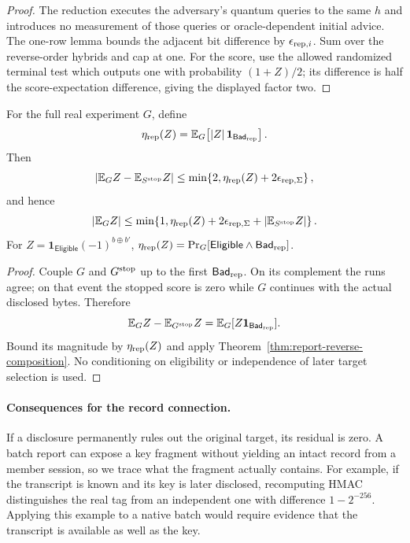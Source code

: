 \begin{proof}
The reduction executes the adversary's quantum queries to the same $h$ and
introduces no measurement of those queries or oracle-dependent initial advice.
The one-row lemma bounds the adjacent bit difference by
$\epsilon_{{\rm rep},i}$.  Sum over the reverse-order hybrids and cap at one.
For the score, use the allowed randomized terminal test which outputs one
with probability $(1+Z)/2$; its difference is half the score-expectation
difference, giving the displayed factor two.
\end{proof}

\begin{corollary}
\label{cor:report-exposure-residual}
For the full real experiment $G$, define
\[
 \eta_{\rm rep}(Z)
 =\mathbb E_G\!\left[|Z|\,
                    \mathbf1_{\mathsf{Bad}_{\rm rep}}\right].
\]
Then
\[
 \left|\mathbb E_GZ-\mathbb E_{S^{\rm stop}}Z\right|
 \le\min\!\left\{2,\eta_{\rm rep}(Z)
                       +2\epsilon_{{\rm rep},\Sigma}\right\},
\]
and hence
\[
 |\mathbb E_GZ|
 \le\min\!\left\{1,\eta_{\rm rep}(Z)
       +2\epsilon_{{\rm rep},\Sigma}
       +|\mathbb E_{S^{\rm stop}}Z|\right\}.
\]
For $Z=\mathbf1_{\mathsf{Eligible}}(-1)^{b\oplus b'}$,
$\eta_{\rm rep}(Z)=
\Pr_G[\mathsf{Eligible}\land\mathsf{Bad}_{\rm rep}]$.
\end{corollary}

\begin{proof}
Couple $G$ and $G^{\rm stop}$ up to the first
$\mathsf{Bad}_{\rm rep}$.  On its complement the runs agree; on that event the
stopped score is zero while $G$ continues with the actual disclosed bytes.
Therefore
\[
 \mathbb E_GZ-\mathbb E_{G^{\rm stop}}Z
   =\mathbb E_G[Z\mathbf1_{\mathsf{Bad}_{\rm rep}}].
\]
Bound its magnitude by $\eta_{\rm rep}(Z)$ and apply
Theorem~\ref{thm:report-reverse-composition}.  No conditioning on eligibility
or independence of later target selection is used.
\end{proof}

\paragraph{Consequences for the record connection.}
If a disclosure permanently rules out the original target, its
residual is zero. A batch report can expose a key fragment without
yielding an intact record from a member session, so we trace what the
fragment actually contains. For example, if the transcript is known
and its key is later disclosed, recomputing HMAC distinguishes the
real tag from an independent one with difference $1-2^{-256}$.
Applying this example to a native batch would require evidence that
the transcript is available as well as the key.


